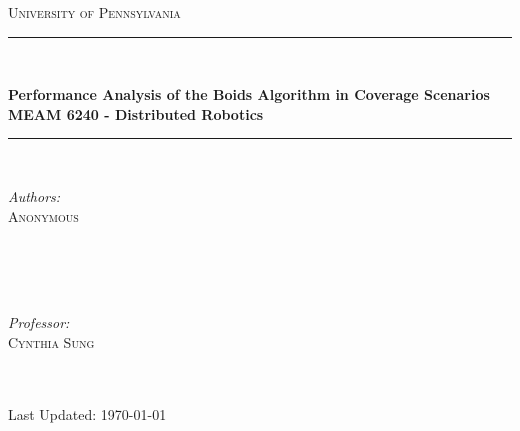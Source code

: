 \documentclass[12pt]{article}
\begin{document}

\thispagestyle{empty}
\newcommand{\titleName}{Performance Analysis of the Boids Algorithm in Coverage Scenarios\\[.4cm]
\textmd{\LARGE MEAM 6240 - Distributed Robotics}}
\begin{titlepage} 
	\newcommand{\HRule}{\rule{\linewidth}{0.5mm}}
	\center
	\textsc{\LARGE University of Pennsylvania}\\[2.5cm] 
	{\color{black} \HRule\\[0.4cm]}
	{\huge\bfseries \titleName}\\[0.4cm] 
	{\color{black} \HRule\\[0.4cm]}
	\begin{minipage}{0.4\textwidth}
		\begin{flushleft}
			\large
			\textit{Authors:}\\
            \textsc{Anonymous}
            \text{ }\\
            \text{ }\\
            \text{ }\\
		\end{flushleft}
	\end{minipage}
	~
	\begin{minipage}{0.4\textwidth}
		\begin{flushright}
			\large
			\textit{Professor:}\\
			\textsc{Cynthia Sung}\\ 
            \text{ }\\
            \text{ }\\
		\end{flushright}
	\end{minipage}
	\vfill

    \vfill
	{\large Last Updated: \today}
	\vfill
\end{titlepage}


\thispagestyle{tocstyle}
\tableofcontents
{}
\pagebreak


\setcounter{page}{1}
\end{document}
